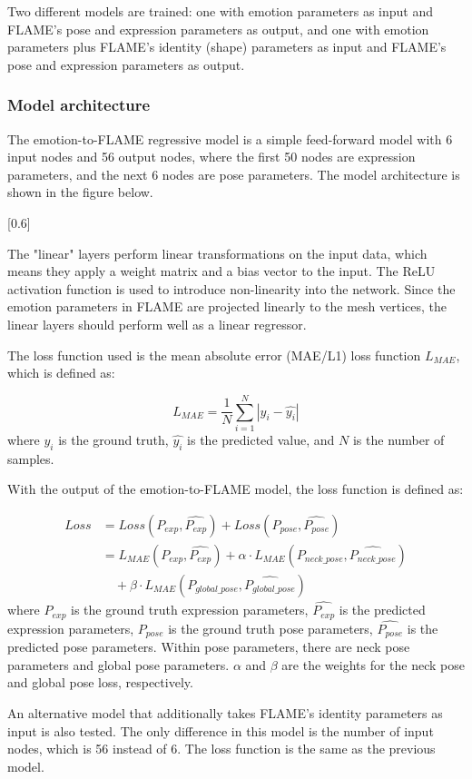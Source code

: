 Two different models are trained: one with emotion parameters as input and FLAME's pose and expression parameters as output, and one with emotion parameters plus FLAME's identity (shape) parameters as input and FLAME's pose and expression parameters as output.


\subsubsection{Model architecture}

The emotion-to-FLAME regressive model is a simple feed-forward model with 6 input nodes and 56 output nodes, where the first 50 nodes are expression parameters, and the next 6 nodes are pose parameters. The model architecture is shown in the figure below.

[0.6]

The "linear" layers perform linear transformations on the input data, which means they apply a weight matrix and a bias vector to the input. The ReLU activation function is used to introduce non-linearity into the network. Since the emotion parameters in FLAME are projected linearly to the mesh vertices, the linear layers should perform well as a linear regressor.

The loss function used is the mean absolute error (MAE/L1) loss function $L_{MAE}$, which is defined as:

\begin{equation}
    L_{MAE} = \frac{1}{N}\sum_{i=1}^{N}|y_i-\hat{y_i}|
\end{equation}
where $y_i$ is the ground truth, $\hat{y_i}$ is the predicted value, and $N$ is the number of samples.

With the output of the emotion-to-FLAME model, the loss function is defined as:

\begin{equation}
    \begin{split}
        Loss & = Loss(P_{exp},\hat{P_{exp}}) + Loss(P_{pose},\hat{P_{pose}})                               \\
             & = L_{MAE}(P_{exp},\hat{P_{exp}}) + \alpha\cdot L_{MAE}(P_{neck\_pose},\hat{P_{neck\_pose}}) \\
             & \quad + \beta\cdot L_{MAE}(P_{global\_pose},\hat{P_{global\_pose}})
    \end{split}
\end{equation}
where $P_{exp}$ is the ground truth expression parameters, $\hat{P_{exp}}$ is the predicted expression parameters, $P_{pose}$ is the ground truth pose parameters, $\hat{P_{pose}}$ is the predicted pose parameters. Within pose parameters, there are neck pose parameters and global pose parameters. $\alpha$ and $\beta$ are the weights for the neck pose and global pose loss, respectively.

An alternative model that additionally takes FLAME's identity parameters as input is also tested. The only difference in this model is the number of input nodes, which is 56 instead of 6. The loss function is the same as the previous model.